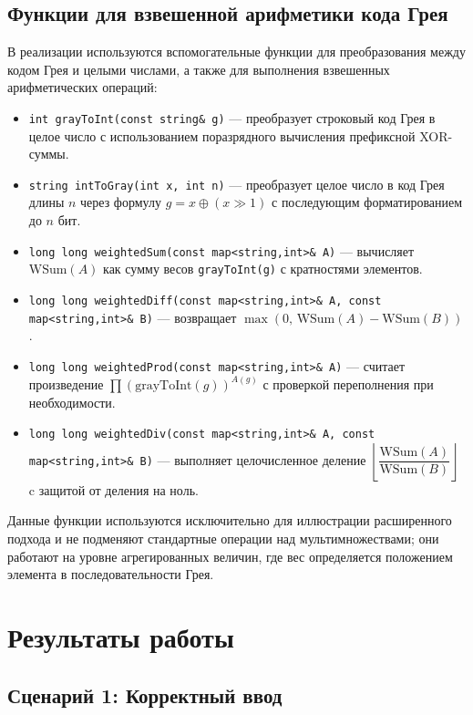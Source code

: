 \documentclass[12pt,a4paper]{article}
\begin{document}
\subsection{Функции для взвешенной арифметики кода Грея}

В реализации используются вспомогательные функции для преобразования между кодом Грея и целыми числами, а также для выполнения взвешенных арифметических операций:
\begin{itemize}
    \item \texttt{int grayToInt(const string\& g)} — преобразует строковый код Грея в целое число с использованием поразрядного вычисления префиксной XOR-суммы.
    \item \texttt{string intToGray(int x, int n)} — преобразует целое число в код Грея длины $n$ через формулу $g = x \oplus (x \gg 1)$ с последующим форматированием до $n$ бит.
    \item \texttt{long long weightedSum(const map<string,int>\& A)} — вычисляет $\text{WSum}(A)$ как сумму весов \texttt{grayToInt(g)} с кратностями элементов.
    \item \texttt{long long weightedDiff(const map<string,int>\& A, const map<string,int>\& B)} — возвращает $\max(0,\,\text{WSum}(A)-\text{WSum}(B))$.
    \item \texttt{long long weightedProd(const map<string,int>\& A)} — считает произведение $\prod (\text{grayToInt}(g))^{A(g)}$ с проверкой переполнения при необходимости.
    \item \texttt{long long weightedDiv(const map<string,int>\& A, const map<string,int>\& B)} — выполняет целочисленное деление $\left\lfloor\dfrac{\text{WSum}(A)}{\text{WSum}(B)}\right\rfloor$ c защитой от деления на ноль.
\end{itemize}

Данные функции используются исключительно для иллюстрации расширенного подхода и не подменяют стандартные операции над мультимножествами; они работают на уровне агрегированных величин, где вес определяется положением элемента в последовательности Грея.

\newpage

\section{Результаты работы}

\subsection{Сценарий 1: Корректный ввод}
\end{document}
